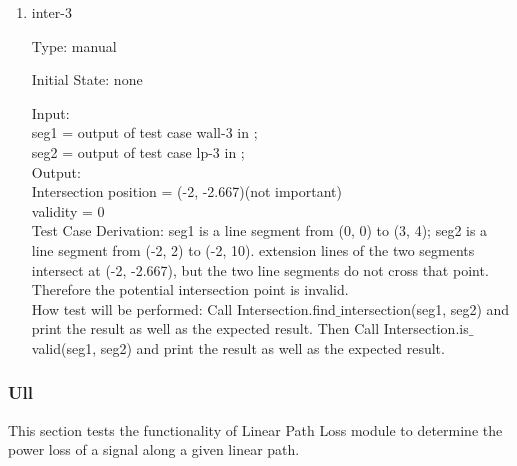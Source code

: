 \documentclass[12pt, titlepage]{article}
\begin{document}
\begin{enumerate}
\item{inter-3\\}

Type: manual
					
Initial State: none
					
Input: \\
seg1 = output of test case wall-3 in ;\\
seg2 = output of test case lp-3 in ;\\
					
Output: \\
Intersection position = (-2, -2.667)(not important)\\
validity = 0\\

Test Case Derivation: seg1 is a line segment from (0, 0) to (3, 4); seg2 is a line segment from (-2, 2) to (-2, 10). extension lines of the two segments intersect at (-2, -2.667), but the two line segments do not cross that point. Therefore the potential intersection point is invalid.\\

How test will be performed: Call Intersection.find$\_$intersection(seg1, seg2) and print the result
as well as the expected result. Then Call Intersection.is$\_$valid(seg1, seg2) and print the result
as well as the expected result.
    
\end{enumerate}

\subsubsection{Ull}
\label{ll}

This section tests the functionality of Linear Path Loss module to determine the power loss of a signal along a given linear path.
\end{document}
